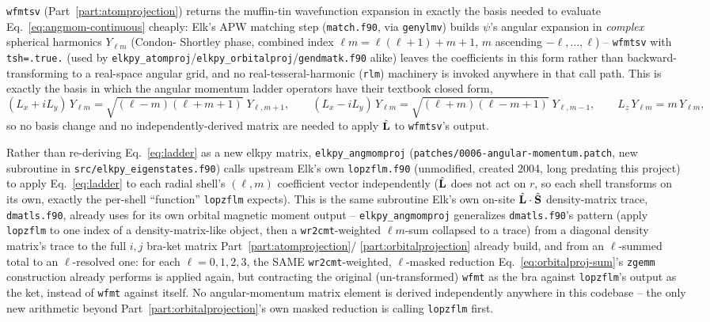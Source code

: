 \documentclass[11pt]{article}
\begin{document}
\texttt{wfmtsv} (Part~\ref{part:atomprojection}) returns the muffin-tin wavefunction
expansion in exactly the basis needed to evaluate Eq.~\eqref{eq:angmom-continuous}
cheaply: Elk's APW matching step (\texttt{match.f90}, via \texttt{genylmv}) builds
$\psi$'s angular expansion in \emph{complex} spherical harmonics $Y_{\ell m}$ (Condon-
Shortley phase, combined index $\ell m=\ell(\ell{+}1){+}m{+}1$, $m$ ascending
$-\ell,\dots,\ell$) -- \texttt{wfmtsv} with \texttt{tsh=.true.} (used by
\texttt{elkpy\_atomproj}/\texttt{elkpy\_orbitalproj}/\texttt{gendmatk.f90} alike) leaves the
coefficients in this form rather than backward-transforming to a real-space angular grid,
and no real-tesseral-harmonic (\texttt{rlm}) machinery is invoked anywhere in that call
path. This is exactly the basis in which the angular momentum ladder operators have their
textbook closed form,
\begin{equation}
  (L_x+iL_y)\,Y_{\ell m} = \sqrt{(\ell-m)(\ell+m+1)}\;Y_{\ell,m+1}, \qquad
  (L_x-iL_y)\,Y_{\ell m} = \sqrt{(\ell+m)(\ell-m+1)}\;Y_{\ell,m-1}, \qquad
  L_z\,Y_{\ell m} = m\,Y_{\ell m},
  \label{eq:ladder}
\end{equation}
so no basis change and no independently-derived matrix are needed to apply $\hat{\bf L}$ to
\texttt{wfmtsv}'s output.

Rather than re-deriving Eq.~\eqref{eq:ladder} as a new elkpy matrix, \texttt{elkpy\_angmomproj}
(\texttt{patches/0006-angular-momentum.patch}, new subroutine in
\texttt{src/elkpy\_eigenstates.f90}) calls upstream Elk's own \texttt{lopzflm.f90}
(unmodified, created 2004, long predating this project) to apply Eq.~\eqref{eq:ladder} to
each radial shell's $(\ell,m)$ coefficient vector independently ($\hat{\bf L}$ does not act
on $r$, so each shell transforms on its own, exactly the per-shell ``function''
\texttt{lopzflm} expects). This is the same subroutine Elk's own on-site $\hat{\bf L}\cdot
\hat{\bf S}$ density-matrix trace, \texttt{dmatls.f90}, already uses for its own orbital
magnetic moment output -- \texttt{elkpy\_angmomproj} generalizes \texttt{dmatls.f90}'s
pattern (apply \texttt{lopzflm} to one index of a density-matrix-like object, then a
\texttt{wr2cmt}-weighted $\ell m$-sum collapsed to a trace) from a diagonal density matrix's
trace to the full $i,j$ bra-ket matrix Part~\ref{part:atomprojection}/
\ref{part:orbitalprojection} already build, and from an $\ell$-summed total to an
$\ell$-resolved one: for each $\ell=0,1,2,3$, the SAME \texttt{wr2cmt}-weighted,
$\ell$-masked reduction Eq.~\eqref{eq:orbitalproj-sum}'s \texttt{zgemm} construction already
performs is applied again, but contracting the original (un-transformed) \texttt{wfmt} as
the bra against \texttt{lopzflm}'s output as the ket, instead of \texttt{wfmt} against
itself. No angular-momentum matrix element is derived independently anywhere in this
codebase -- the only new arithmetic beyond Part~\ref{part:orbitalprojection}'s own masked
reduction is calling \texttt{lopzflm} first.
\end{document}
